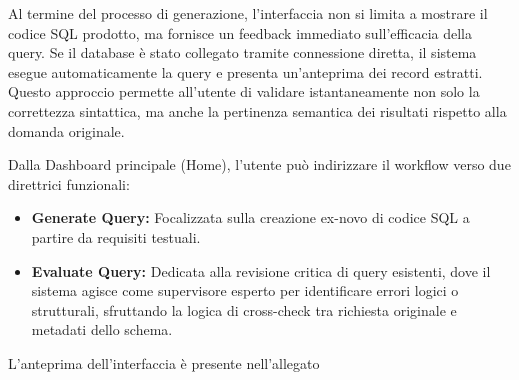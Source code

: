 
Al termine del processo di generazione, l'interfaccia non si limita a
mostrare il codice SQL prodotto, ma fornisce un feedback immediato
sull'efficacia della query. Se il database è stato collegato tramite
connessione diretta, il sistema esegue automaticamente la query e
presenta un'anteprima dei record estratti. Questo approccio
permette all'utente di validare istantaneamente non solo la correttezza
sintattica, ma anche la pertinenza semantica dei risultati rispetto alla
domanda originale.

Dalla Dashboard principale (Home), l'utente può indirizzare il workflow
verso due direttrici funzionali:

\begin{itemize}
\item
  \textbf{Generate Query:} Focalizzata sulla creazione ex-novo di
  codice SQL a partire da requisiti testuali.
\item
  \textbf{Evaluate Query:} Dedicata alla revisione critica di query
  esistenti, dove il sistema agisce come supervisore esperto per
  identificare errori logici o strutturali, sfruttando la logica di
  cross-check tra richiesta originale e metadati dello schema.
\end{itemize}

L'anteprima dell'interfaccia è presente nell'allegato